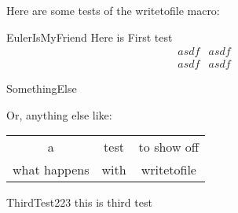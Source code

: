 \documentclass{book}
\begin{document}
Here are some tests of the writetofile macro:
\begin{writetofile}{EulerIsMyFriend}
{Here is First test
     \begin{eqnarray}
asdf&asdf\\
asdf&asdf
\end{eqnarray}}
\end{writetofile}

\vskip36pt


\begin{writetofile}{SomethingElse}
{Or, anything else like:
\begin{tabular}{ccc}
a&test&to show off\\
what happens&with&writetofile
\end{tabular}
}
\end{writetofile}

\vskip36pt

\begin{writetofile}{ThirdTest223}
{this is third test}
\end{writetofile}
\end{document}
